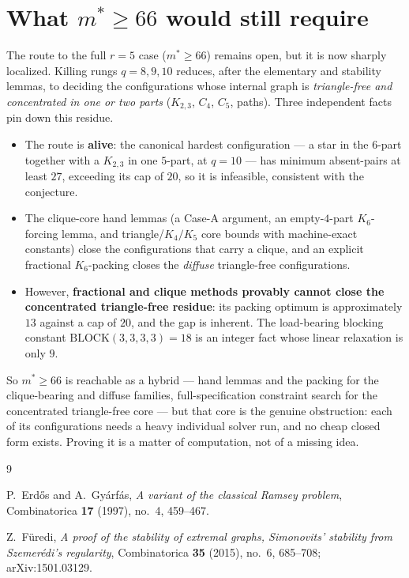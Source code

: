 \documentclass[11pt]{article}
\theoremstyle{definition}
\newcommand{\mstar}{m^{*}}
\newcommand{\Kn}[1]{K_{#1}}
\begin{document}
\section{What $\mstar \ge 66$ would still require}\label{sec:gap}

The route to the full $r = 5$ case ($\mstar \ge 66$) remains open, but it is now
sharply localized. Killing rungs $q = 8, 9, 10$ reduces, after the elementary and
stability lemmas, to deciding the configurations whose internal graph is
\emph{triangle-free and concentrated in one or two parts} ($K_{2,3}$, $C_4$, $C_5$,
paths). Three independent facts pin down this residue.
\begin{itemize}
  \item The route is \textbf{alive}: the canonical hardest configuration --- a star
    in the $6$-part together with a $K_{2,3}$ in one $5$-part, at $q = 10$ --- has
    minimum absent-pairs at least $27$, exceeding its cap of $20$, so it is
    infeasible, consistent with the conjecture.
  \item The clique-core hand lemmas (a Case-A argument, an empty-$4$-part
    $\Kn{6}$-forcing lemma, and triangle/$K_4/K_5$ core bounds with
    machine-exact constants) close the configurations that carry a clique, and an
    explicit fractional $\Kn{6}$-packing closes the \emph{diffuse} triangle-free
    configurations.
  \item However, \textbf{fractional and clique methods provably cannot close the
    concentrated triangle-free residue}: its packing optimum is approximately $13$
    against a cap of $20$, and the gap is inherent. The load-bearing blocking
    constant $\mathrm{BLOCK}(3,3,3,3) = 18$ is an integer fact whose linear
    relaxation is only $9$.
\end{itemize}

So $\mstar \ge 66$ is reachable as a hybrid --- hand lemmas and the packing for the
clique-bearing and diffuse families, full-specification constraint search for the
concentrated triangle-free core --- but that core is the genuine obstruction: each
of its configurations needs a heavy individual solver run, and no cheap closed form
exists. Proving it is a matter of computation, not of a missing idea.

\begin{thebibliography}{9}

P.~Erd\H{o}s and A.~Gy\'arf\'as,
\emph{A variant of the classical Ramsey problem},
Combinatorica \textbf{17} (1997), no.~4, 459--467.

Z.~F\"uredi,
\emph{A proof of the stability of extremal graphs, Simonovits' stability from
Szemer\'edi's regularity},
Combinatorica \textbf{35} (2015), no.~6, 685--708; arXiv:1501.03129.

\end{thebibliography}
\end{document}
